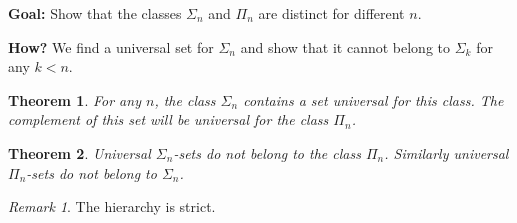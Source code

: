 \documentclass[10pt, letterpaper]{article}
\newtheorem{thm}{Theorem}
\theoremstyle{remark}
\newtheorem{rem}{Remark}
\theoremstyle{definition}
\begin{document}
    \textbf{Goal: } Show that the classes $\Sigma_n$ and $\Pi_n$ are distinct for different $n$.

    \textbf{How? } We find a universal set for $\Sigma_n$ and show that it cannot belong to $\Sigma_k$ for any $k < n$.

    \begin{thm}
        For any $n$, the class $\Sigma_n$ contains a set universal for this class. The complement of this set will be 
        universal for the class $\Pi_n$.
    \end{thm}

    \begin{thm}
        Universal $\Sigma_n$-sets do not belong to the class $\Pi_n$. Similarly universal $\Pi_n$-sets do not belong to $\Sigma_n$.
    \end{thm}

    \begin{rem}
        The hierarchy is strict.
    \end{rem}
\end{document}
